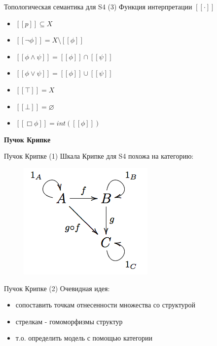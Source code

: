 \documentclass{beamer}
\begin{document}
\begin{frame}{Топологическая семантика для S4 (3)}
Функция интерпретации $[ \! [ \cdot ] \! ]$\\
\bigskip
\begin{itemize}
	\item $[ \! [ p ] \! ] \subseteq X$\\
	\item $[ \! [ \neg \phi ] \! ] = X \setminus [ \! [ \phi ] \! ]$
	\item $[ \! [ \phi \wedge \psi ] \! ] = [ \! [ \phi ] \! ] \cap [ \! [ \psi ] \! ]$
	\item $[ \! [ \phi \vee \psi ] \! ] = [ \! [ \phi ] \! ] \cup [ \! [ \psi ] \! ]$
	\item $[ \! [ \top ] \! ] = X$
	\item $[ \! [ \bot ] \! ] = \varnothing$
	\item $[ \! [ \Box \phi ] \! ] = int([ \! [ \phi ] \! ])$
\end{itemize}
\end{frame}

\begin{frame}{}
\begin{center}
	\textbf{Пучок Крипке}
\end{center}
\end{frame}

\begin{frame}{Пучок Крипке (1)}
Шкала Крипке для S4 похожа на категорию:\\
\bigskip
\begin{center}
	\begin{figure}[H]
		\includegraphics[scale=0.6]{basic_category.png} 
	\end{figure}
\end{center}
\end{frame}

\begin{frame}{Пучок Крипке (2)}
Очевидная идея:\\
\bigskip
\begin{itemize}
	\item сопоставить точкам отнесенности множества со структурой
	\item стрелкам - гомоморфизмы структур
	\item т.о. определить модель с помощью категории
\end{itemize}
\end{frame}
\end{document}
